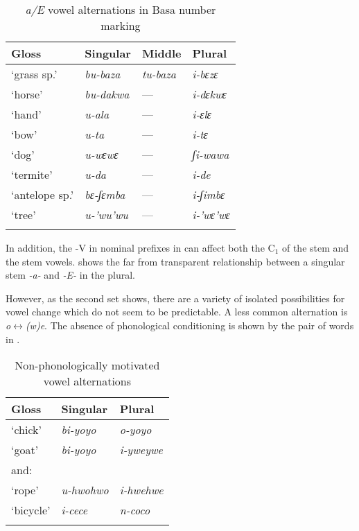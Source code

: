 \documentclass[output=paper]{langsci/langscibook}
\begin{document}
\begin{table}[b]
\caption{\label{tab:kainji:24} \textit{a/E} vowel alternations in Basa number marking}
\begin{tabularx}{\textwidth}{XXXX}
\lsptoprule 
{Gloss}	& {Singular}	& {Middle}	& {Plural}\\
\midrule
`grass sp.'	&  \textit{bu-baza}	&  \textit{tu-baza}	&  \textit{i-bɛzɛ}\\
`horse'	&  \textit{bu-dakwa}	& —	&  \textit{i-dɛkwɛ}\\
`hand'	&  \textit{u-ala}	& —	&  \textit{i-ɛlɛ}\\
`bow'	&  \textit{u-ta}	& —	&  \textit{i-tɛ}\\
\tablevspace
`dog'	&  \textit{u-wɛwɛ}	& —	&  \textit{ʃi-wawa}\\
`termite'	&  \textit{u-da}	& —	&  \textit{i-de}\\
`antelope sp.'	&  \textit{bɛ-ʃɛmba}	& —	&  \textit{i-ʃimbɛ}\\
`tree'	&  \textit{u-’wu’wu}	& —	&  \textit{i-’wɛ’wɛ}\\
\lspbottomrule
\end{tabularx}
\end{table}

  
In addition, the -V in nominal prefixes in  can affect both the C$_1$ of the stem and the stem vowels.  shows the far from transparent relationship between a singular stem \textit{-a-} and \textit{-E-} in the plural.

However, as the second set shows, there are a variety of isolated possibilities for vowel change which do not seem to be predictable. A less common alternation is \textit{o$\leftrightarrow $(w)e}. The absence of phonological conditioning is shown by the pair of words in .

\begin{table}[b]
\caption{\label{extab:kainji:25} Non-phonologically motivated vowel alternations}
\begin{tabularx}{\textwidth}{XXX}
\lsptoprule
{Gloss}	& {Singular}	& {Plural}\\
\midrule
‘chick’	&  \textit{bi-yoyo}	&  \textit{o-yoyo}\\
‘goat’	&  \textit{bi-yoyo}	&  \textit{i-yweywe}\\
and:	& 	& \\
‘rope’	&  \textit{u-hwohwo}	&  \textit{i-hwehwe}\\
‘bicycle’	&  \textit{i-cece}	&  \textit{n-coco}\\
\lspbottomrule
\end{tabularx}
\end{table}
\end{document}
